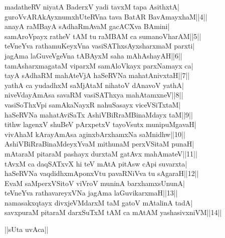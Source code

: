 \documentclass{article}
\begin{document}
madatheRV niyatA BaderxV yadi tavxM tapa AsithxtA|\\
guroVvARAkAyxnumxhUteRVna tava BatAR BavAmayxhaM||4||\\
anayA raMBayA sAdhaRmAvaM gacACXva BAmini|\\
samAroVpayx ratheV tAM tu raMBAM ca sumanoVharAM||5||\\
teVneYva rathamuKeyxVna vasiSAThxsAyxsharxmaM parxti|\\
jagAma laGuveVgeVna tABAyxM saha mAhAshayAH||6||\\
tamAsharxmagataM viparxM samAloVkayx parxNamayx ca|\\
tayA sAdhaRM mahAteVjA haSeRVNa mahatAnivxtaH||7||\\
yathA ca yudadhxM saMjAtaM nihatoV dAnavoV yathA|\\
niveVdayAmAsa savaRM vasiSAThxya mahAtamxneV||8||\\
vasiSoThxVpi samAkaNayxR nahuSasayx viceVSiTxtaM|\\
haSeRVNa mahatAviSaTx AshiVBiRraMBinaMdayx taM||9||\\
tithw lagenxV shuBeV pArxpetxV tayoVsutx munipuMgavaH|\\
vivAhaM kArayAmAsa aginxbArxhamxNa saMnidhw||10||\\
AshiVBiRraBinaMdeyxYvaM mithunaM perxVSitaM punaH|\\
mAtaraM pitaraM pashayx durxtaM gatAvx mahAmateV||11||\\
tAvxM ca daqSATxvX hi teV mAtA pitAsw cApi suvarxta|\\
haSeRVNa vaqdidhxmAponxVtu pavaRNiVva tu sAgaraH||12||\\
EvaM saMperxVSitoV viVroV muninA barxhamxsUnunA|\\
teVneYva rathavareyxVNa jagAma laGuvikarxmaH||13||\\
namasakxqtayx divxjeVMdarxM taM gatoV mAtalinA tadA|\\
savxpuraM pitaraM darxSuTxM tAM ca mAtAM yashasivxniVM||14||\\

\begin{center}
||sUta uvAca||
\end{center}
\end{document}
